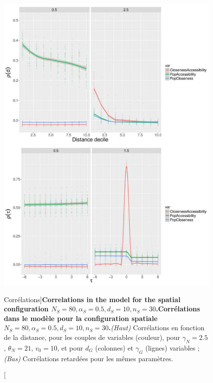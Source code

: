 \begin{figure}
\includegraphics[width=\linewidth,height=0.9\textheight]{Figures/Final/6-1-3-fig-macrocoevolexplo-correlations.jpg}
	\caption[Correlations][Corrélations]{\textbf{Correlations in the model for the spatial configuration $N_S=80,\alpha_S=0.5,d_S=10,n_S=30$.}\label{fig:macrocoevolexplo:correlations}}{\textbf{Corrélations dans le modèle pour la configuration spatiale $N_S=80,\alpha_S=0.5,d_S=10,n_S=30$.}\textit{(Haut)} Corrélations en fonction de la distance, pour les couples de variables (couleur), pour $\gamma_N = 2.5$, $\theta_N = 21$, $v_0 = 10$, et pour $d_G$ (colonnes) et $\gamma_G$ (lignes) variables ; \textit{(Bas)} Corrélations retardées pour les mêmes paramètres.\label{fig:macrocoevolexplo:correlations}}
\end{figure}








\stars

















